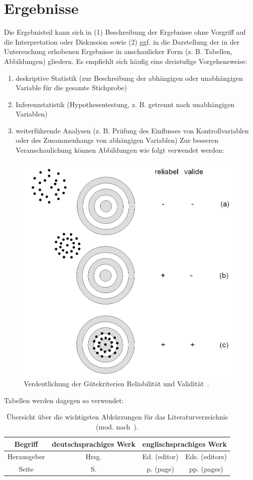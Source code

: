 \chapter{Ergebnisse}
Die Ergebnisteil kann sich in (1) Beschreibung der Ergebnisse ohne Vorgriff auf die Interpretation oder Diskussion sowie (2) ggf. in die Darstellung der in der Untersuchung erhobenen Ergebnisse in anschaulicher Form (z. B. Tabellen, Abbildungen) gliedern. Es empfiehlt sich häufig eine dreistufige Vorgehensweise:
\begin{enumerate}
	\item deskriptive Statistik (zur Beschreibung der abhängigen oder unabhängigen Variable für die gesamte Stichprobe)
	\item Inferenzstatistik (Hypothesentestung, z. B. getrennt nach unabhängigen Variablen)
	\item weiterführende Analysen (z. B. Prüfung des Einflusses von Kontrollvariablen oder des Zusammenhangs von abhängigen Variablen)
	Zur besseren Veranschaulichung können Abbildungen wie folgt verwendet werden:	
\end{enumerate}
\begin{figure}[h]
	\centering
	\includegraphics[width=0.7\linewidth]{images/guetekriterien-reliabilitaet-und-variabilitaet}
	\caption{Verdeutlichung der Gütekriterien Reliabilität und Validität~\parencite[23]{Boes2004}.}
	\label{fig:guetekriterien-reliabilitaet-und-variabilitaet}
\end{figure}
Tabellen werden dagegen so verwendet:
\begin{table}[h]
	\centering
	\caption{Übersicht über die wichtigsten Abkürzungen für das Literaturverzeichnis (mod. nach~\cite[9]{DVS2013}).}
	\label{tab:uebersicht-wichtigste-abkuerzungen}
	\begin{tabular}{|c|c|c|c|}
		\hline
		Begriff & deutschsprachiges Werk & \multicolumn{2}{c|}{englischsprachiges Werk}\\
		\hline
		Herausgeber & Hrsg. & Ed. (editor) & Eds. (editors) \\
		\hline
		Seite & S. & p. (page) & pp. (pages) \\
		\hline
	\end{tabular}
\end{table}
